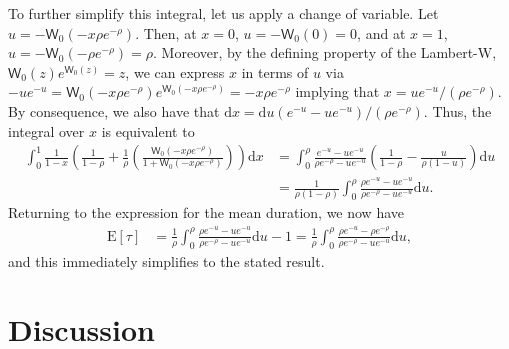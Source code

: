 \documentclass[opre,nonblindrev]{informs3_no_remark}
\newcommand{\E}[1]{{\mathrm{E}\left[#1\right]}}
\begin{document}
To further simplify this integral, let us apply a change of variable. Let $u = - \mathsf{W}_0(-x\rho e^{-\rho})$. Then, at $x=0$, $u = -\mathsf{W}_0(0) = 0$, and at $x=1$, $u = -\mathsf{W}_0(-\rho e^{-\rho}) = \rho$. Moreover, by the defining property of the Lambert-W, $\mathsf{W}_0(z) e^{\mathsf{W}_0(z)} = z$, we can express $x$ in terms of $u$ via $-u e^{-u} = \mathsf{W}_0(-x\rho e^{-\rho}) e^{\mathsf{W}_0(-x\rho e^{-\rho})} = - x \rho e^{-\rho}$ implying that $x = u e^{-u} / (\rho e^{-\rho})$. By consequence, we also have that $\mathrm{d}x = \mathrm{d}u (e^{-u} - u e^{-u})/(\rho e^{-\rho})$. Thus, the integral over $x$ is equivalent to
\begin{align}
\int_0^1\frac{1}{1-x}\left(\frac{1}{1-\rho} +  \frac{1}{\rho}
\left(
\frac{\mathsf{W}_0\left(-x \rho e^{-\rho}\right)}
{1 + \mathsf{W}_0\left(-x \rho e^{-\rho}\right)}
\right)\right)\mathrm{d}x
&=
\int_0^\rho
\frac{e^{-u} - u e^{-u}}{\rho e^{-\rho} - u e^{-u}}
\left(
\frac{1}{1-\rho}
-
\frac{u}{\rho(1-u)}
\right)
\mathrm{d}u
\\
&=
\frac{1}{\rho(1-\rho)}
\int_0^\rho
\frac{\rho e^{-u} - u e^{-u}}{\rho e^{-\rho} - u e^{-u}} \mathrm{d}u
.
\end{align}
Returning to the expression for the mean duration, we now have
\begin{align}
\E{\tau}
&=
\frac{1}{\rho}
\int_0^\rho
\frac{\rho e^{-u} - u e^{-u}}{\rho e^{-\rho} - u e^{-u}} 
\mathrm{d}u
-
1
=
\frac{1}{\rho}
\int_0^\rho
\frac{\rho e^{-u} - \rho e^{-\rho}}{\rho e^{-\rho} - u e^{-u}} 
\mathrm{d}u
,
\end{align}
and this immediately simplifies to the stated result.
\hfill\Halmos\endproof

\section{Discussion}\label{concSec}
\end{document}

